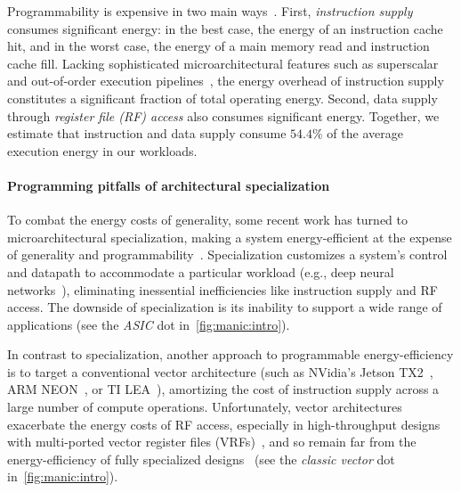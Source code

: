 Programmability is expensive in two main ways~\cite{horowitz:isscc14:energy-keynote,hameed2010understanding,balfour_elm_thesis}.
First, \emph{instruction supply} consumes significant energy: in the best case, the energy of
an instruction cache hit, and in the worst case, the energy of a main memory
read and instruction cache fill.  
%
Lacking sophisticated microarchitectural features such as superscalar and
out-of-order execution pipelines~\cite{msp430fr5994,traber2016pulpino}, the energy overhead of
instruction supply constitutes a significant fraction of total operating energy.
%
Second, data supply through \emph{register file (RF) access} also consumes significant energy.
%
Together, we estimate that instruction and data supply consume
$54.4\%$ of the average execution energy in our workloads.

\paragraph{Programming pitfalls of architectural specialization}
To combat the energy costs of generality, some recent work has turned to
microarchitectural specialization, making a system energy-efficient at the
expense of generality and
programmability~\cite{chen:isca16:eyeriss,chen:asplos14:diannao,du:isca15:shidiannao,liu:isca15:pudiannao,chen2014dadiannao,venkatesh2010conservation}.
Specialization customizes a system's control and datapath to accommodate a
particular workload (e.g., deep neural networks~\cite{chen:isca16:eyeriss,chen:asplos14:diannao}),
eliminating inessential inefficiencies like instruction supply and RF access.
The downside of specialization is its 
inability to support a wide range of applications (see the \textit{ASIC} dot in~\autoref{fig:manic:intro}).

In contrast to specialization, another approach to programmable
energy-efficiency is to target a conventional vector architecture (such as
NVidia's Jetson TX2~\cite{jetsontx2}, ARM NEON~\cite{neon}, or TI LEA~\cite{lea}), amortizing the cost of instruction
supply across a large number of compute operations. Unfortunately,
vector architectures exacerbate the energy costs of RF access,
especially in high-throughput designs with multi-ported vector register files (VRFs)~\cite{kozyrakis2003overcoming,asanovic1996t0,iram},
and so remain far from the energy-efficiency of fully specialized designs~\cite{hameed2010understanding} (see the \textit{classic vector} dot in~\autoref{fig:manic:intro}).

